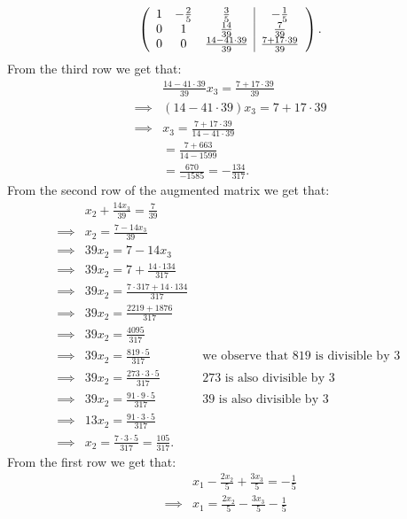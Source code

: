 \documentclass[10pt]{article}
\begin{document}
\begin{solution}[]
\begin{align*}
\left( \begin{array}{c c c | c}
1  &  -\frac{2}{5}  &  \frac{3}{5}  &  -\frac{1}{5} \\
0  &  1  &  \frac{14}{39}  &  \frac{7}{39} \\
0  &  0 & \frac{14 - 41 \cdot 39}{39} & \frac{7 + 17 \cdot 39}{39}
\end{array} \right)
.
\end{align*}
From the third row we get that:
\begin{align*} &  \frac{14 -41 \cdot39}{39} x_3 = \frac{7 + 17 \cdot39}{39} \\
\implies &  (14 - 41 \cdot39) x_3 = 7 + 17 \cdot 39 \\
\implies & x_3   = \frac{7 + 17 \cdot39}{14 - 41 \cdot39} \\
&    = \frac{7 + 663}{14 - 1599} \\
 &    = \frac{670}{- 1585} = - \frac{134}{317} 
.
\end{align*}
From the second row of the augmented matrix we get that:
\begin{align*}
 &  x_2 + \frac{14x_3}{39} = \frac{7}{39} \\
\implies & x_2 = \frac{7 - 14x_3}{39} \\
\implies & 39x_2 = 7 - 14x_3 \\
\implies & 39x_2 = 7 + \frac{14 \cdot 134}{317} \\
\implies & 39x_2 = \frac{7 \cdot317 + 14 \cdot 134}{317}  \\
\implies & 39x_2 = \frac{2219  + 1876}{317}  \\
\implies & 39x_2 = \frac{4095}{317}  \\
\implies & 39x_2 = \frac{819 \cdot 5}{317}  &  \text{ we observe that 819 is divisible by 3 }  \\
\implies & 39x_2 = \frac{273 \cdot 3 \cdot 5}{317} &   \text{ 273 is also divisible by 3 } \\
\implies & 39x_2 = \frac{91 \cdot 9 \cdot 5}{317}  &  \text{ 39 is also divisible by 3 } \\
\implies & 13x_2 = \frac{91 \cdot 3 \cdot 5}{317} \\
\implies & x_2 = \frac{7 \cdot 3 \cdot 5}{317} = \frac{105}{317} 
.
\end{align*}
From the first row we get that:
\begin{align*}
 &  x_1 - \frac{2x_2}{5} + \frac{3x_3}{5} = -\frac{1}{5} \\
\implies & x_1 = \frac{2x_2}{5} - \frac{3x_3}{5} -\frac{1}{5} \\

\end{align*}
\end{solution}
\end{document}
